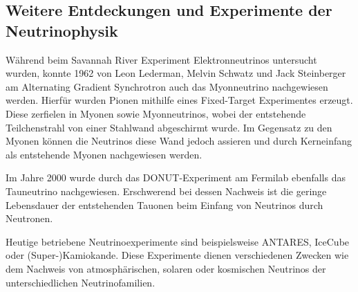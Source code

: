 \subsection{Weitere Entdeckungen und Experimente der Neutrinophysik}
Während beim Savannah River Experiment Elektronneutrinos untersucht wurden, konnte 1962 von Leon Lederman, Melvin Schwatz und Jack Steinberger am Alternating Gradient Synchrotron auch das Myonneutrino nachgewiesen werden.
Hierfür wurden Pionen mithilfe eines Fixed-Target Experimentes erzeugt.
Diese zerfielen in Myonen sowie Myonneutrinos, wobei der entstehende Teilchenstrahl von einer Stahlwand abgeschirmt wurde.
Im Gegensatz zu den Myonen können die Neutrinos diese Wand jedoch assieren und durch Kerneinfang als entstehende Myonen nachgewiesen werden.

Im Jahre 2000 wurde durch das DONUT-Experiment am Fermilab ebenfalls das Tauneutrino nachgewiesen.
Erschwerend bei dessen Nachweis ist die geringe Lebensdauer der entstehenden Tauonen beim Einfang von Neutrinos durch Neutronen.

Heutige betriebene Neutrinoexperimente sind beispielsweise ANTARES, IceCube oder (Super-)Kamiokande.
Diese Experimente dienen verschiedenen Zwecken wie dem Nachweis von atmosphärischen, solaren oder kosmischen Neutrinos der unterschiedlichen Neutrinofamilien.